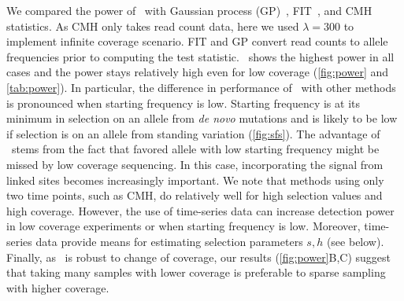 We compared the power of \comale\ with Gaussian process
(GP)~\cite{Terhorst2015Multi}, FIT~\cite{feder2014Identifying}, and
CMH~\cite{agresti2011categorical} statistics.  As CMH only takes read
count data, here we used $\lambda=300$ to implement infinite coverage
scenario. FIT and GP convert read counts
to allele frequencies prior to computing the test statistic.  \comale\
shows the highest power in all cases and the power stays relatively
high even for low coverage (\ref{fig:power} and
\ref{tab:power}). In particular, the difference in performance
of \comale\ with other methods is pronounced when starting frequency
is low. Starting frequency is at its minimum in selection on an allele
from \emph{de novo} mutations and is likely to be low if selection is
on an allele from standing variation (\ref{fig:sfs}).  The
advantage of \comale\ stems from the fact that favored allele with low
starting frequency might be missed by low coverage sequencing. In this
case, incorporating the signal from linked sites becomes increasingly
important. We note that methods using only two time points, such as
CMH, do relatively well for high selection values and high
coverage. However, the use of time-series data can increase detection
power in low coverage experiments or when starting frequency is
low. Moreover, time-series data provide means for estimating selection
parameters $s,h$ (see below). Finally, as \comale\ is robust to change
of coverage, our results (\ref{fig:power}B,C) suggest that taking
many samples with lower coverage is preferable to sparse sampling with
higher coverage.


